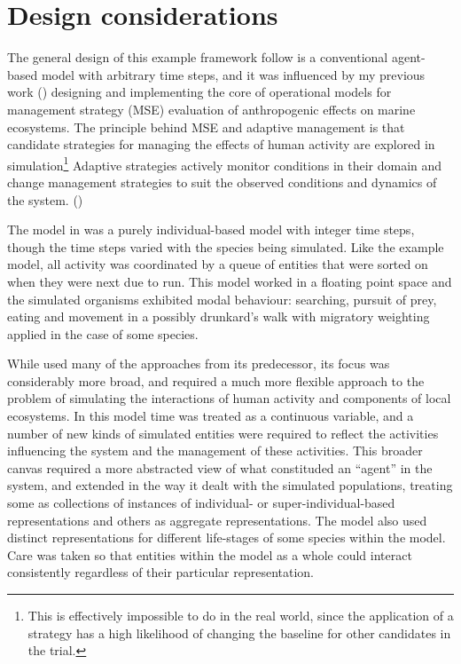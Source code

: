 \section{Design considerations}
The general design of this example framework follow is a conventional
agent-based model with arbitrary time steps, and it was influenced by
my previous work (\cite{Lyne1994pmez5, gray2006nws, gray2014}) designing 
and implementing the core of operational models for management strategy (MSE)
evaluation of anthropogenic effects on marine ecosystems.  The
principle behind MSE and adaptive management is that candidate strategies for
managing the effects of human activity are explored in 
simulation\footnote{This is effectively impossible to do in the real
  world, since the application of a strategy has a high likelihood of
  changing the baseline for other candidates in the trial.} Adaptive
strategies actively monitor conditions in their domain and change
management strategies to suit the observed conditions and dynamics of
the system. (\cite{walters1976,smith1993,polacheck1999,sainsbury2000,keith2011})

The model in \cite{Lyne1994pmez5} was a purely individual-based model
with integer time steps, though the time steps varied with the species
being simulated. Like the example model, all activity was coordinated
by a queue of entities that were sorted on when they were next due to
run. This model worked in a floating point space and the simulated
organisms exhibited modal behaviour: searching, pursuit of prey,
eating and movement in a possibly drunkard's walk with migratory
weighting applied in the case of some species.

While \cite{gray2006nws} used many of the approaches from its
predecessor, its focus was considerably more broad, and required a
much more flexible approach to the problem of simulating the
interactions of human activity and components of local ecosystems. In
this model time was treated as a continuous variable, and a number of
new kinds of simulated entities were required to reflect the
activities influencing the system and the management of these
activities. This broader canvas required a more abstracted view of
what constituded an ``agent'' in the system, and extended
\cite{Lyne1994pmez5} in the way it dealt with the simulated
populations, treating some as collections of instances of individual-
or super-individual-based representations and others as aggregate
representations.  The model also used distinct representations for
different life-stages of some species within the model.  Care was
taken so that entities within the model as a whole could interact
consistently regardless of their particular representation.


